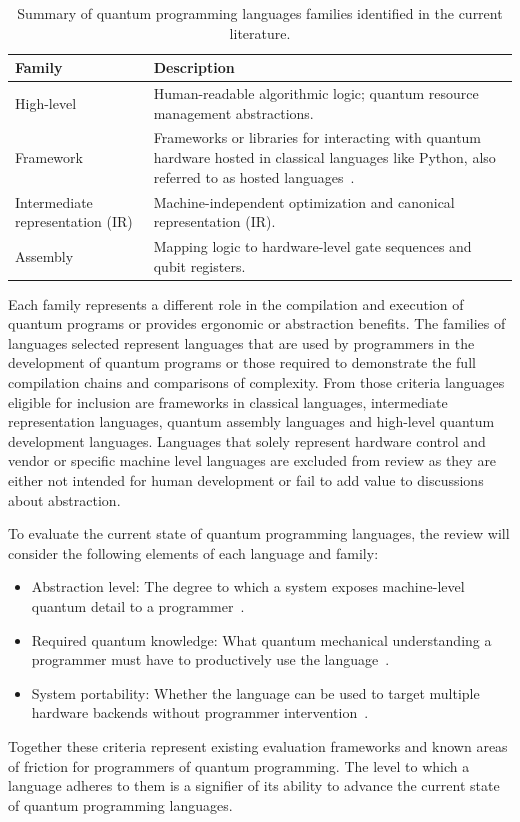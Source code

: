\begin{table}[htbp]
    \centering
    \caption{Summary of quantum programming languages families identified in the current literature.}
    \label{tab:lit_rev:qpl:language_families}
    \begin{tabularx}{\textwidth}{@{}lX@{}}
        \toprule
        \textbf{Family} & \textbf{Description}          \\ \midrule
        High-level & Human-readable algorithmic logic; quantum resource management abstractions. \\
        Framework & Frameworks or libraries for interacting with quantum hardware hosted in classical languages like Python, also referred to as hosted languages~\cite{corralesgarro2025productivityexpressiveness}. \\
        Intermediate representation (IR) & Machine-independent optimization and canonical representation (IR). \\
        Assembly & Mapping logic to hardware-level gate sequences and qubit registers. \\ \bottomrule
    \end{tabularx}
\end{table}

Each family represents a different role in the compilation and execution of quantum programs or provides ergonomic or abstraction benefits.
The families of languages selected represent languages that are used by programmers in the development of quantum programs or those required to demonstrate the full compilation chains and comparisons of complexity.
From those criteria languages eligible for inclusion are frameworks in classical languages, intermediate representation languages, quantum assembly languages and high-level quantum development languages.
Languages that solely represent hardware control and vendor or specific machine level languages are excluded from review as they are either not intended for human development or fail to add value to discussions about abstraction.

To evaluate the current state of quantum programming languages, the review will consider the following elements of each language and family:
\begin{itemize}
    \item Abstraction level: The degree to which a system exposes machine-level quantum detail to a programmer~\cite{DiMatteo2024AbstractionHierarchy}.
    \item Required quantum knowledge: What quantum mechanical understanding a programmer must have to productively use the language~\cite{Myers2016PLUsabilitySIG, ferreira2024qplusage}.
    \item System portability: Whether the language can be used to target multiple hardware backends without programmer intervention~\cite{DiMatteo2024AbstractionHierarchy, nunez_corrales2025betterabstractmachines}.
\end{itemize}
Together these criteria represent existing evaluation frameworks and known areas of friction for programmers of quantum programming.
The level to which a language adheres to them is a signifier of its ability to advance the current state of quantum programming languages.

